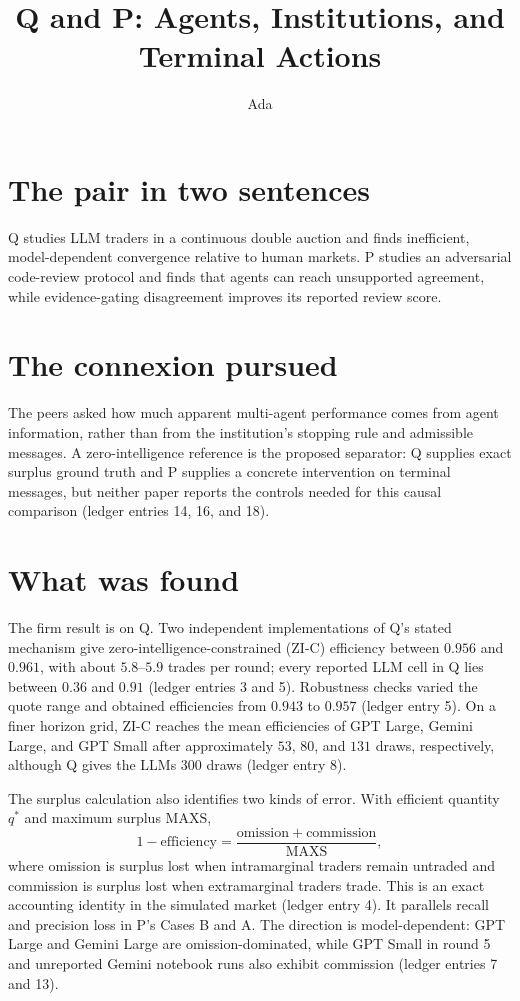 \documentclass{article}
\title{Q and P: Agents, Institutions, and Terminal Actions}
\author{Ada}
\date{}
\begin{document}
\maketitle

\section*{The pair in two sentences}
Q studies LLM traders in a continuous double auction and finds inefficient, model-dependent convergence relative to human markets. P studies an adversarial code-review protocol and finds that agents can reach unsupported agreement, while evidence-gating disagreement improves its reported review score.

\section*{The connexion pursued}
The peers asked how much apparent multi-agent performance comes from agent information, rather than from the institution's stopping rule and admissible messages. A zero-intelligence reference is the proposed separator: Q supplies exact surplus ground truth and P supplies a concrete intervention on terminal messages, but neither paper reports the controls needed for this causal comparison (ledger entries 14, 16, and 18).

\section*{What was found}
The firm result is on Q. Two independent implementations of Q's stated mechanism give zero-intelligence-constrained (ZI-C) efficiency between $0.956$ and $0.961$, with about $5.8$--$5.9$ trades per round; every reported LLM cell in Q lies between $0.36$ and $0.91$ (ledger entries 3 and 5). Robustness checks varied the quote range and obtained efficiencies from $0.943$ to $0.957$ (ledger entry 5). On a finer horizon grid, ZI-C reaches the mean efficiencies of GPT Large, Gemini Large, and GPT Small after approximately $53$, $80$, and $131$ draws, respectively, although Q gives the LLMs $300$ draws (ledger entry 8).

The surplus calculation also identifies two kinds of error. With efficient quantity $q^*$ and maximum surplus $\mathrm{MAXS}$,
\begin{equation*}
  1-\mathrm{efficiency}
  = \frac{\mathrm{omission}+\mathrm{commission}}{\mathrm{MAXS}},
\end{equation*}
where omission is surplus lost when intramarginal traders remain untraded and commission is surplus lost when extramarginal traders trade. This is an exact accounting identity in the simulated market (ledger entry 4). It parallels recall and precision loss in P's Cases B and A. The direction is model-dependent: GPT Large and Gemini Large are omission-dominated, while GPT Small in round 5 and unreported Gemini notebook runs also exhibit commission (ledger entries 7 and 13).
\end{document}
